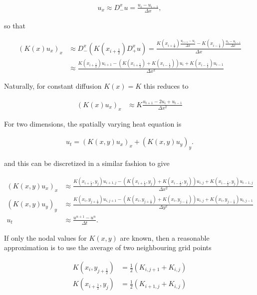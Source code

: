 \documentclass[11pt,a4paper,noindent]{article}
\begin{document}
\begin{align}
u_x \approx D_-^x u = \frac{u_{i}-u_{i-1}}{\Delta x},
\end{align}

so that

\begin{align}
(K(x) u_x)_x &\approx D_-^x(K(x_{i+\frac{1}{2}}) D_+^xu) = \frac{K(x_{i+\frac{1}{2}})\frac{u_{i+1}-u_{i}}{\Delta x} - K(x_{i-\frac{1}{2}})\frac{u_{i}-u_{i-1}}{\Delta x}}{\Delta x} \\
&\approx \frac{ K(x_{i+\frac{1}{2}}) u_{i+1} - 
			    (K(x_{i+\frac{1}{2}})+K(x_{i-\frac{1}{2}}))u_{i} + 								K(x_{i-\frac{1}{2}}) u_{i-1} }{\Delta x^2}
\end{align}

Naturally, for constant diffusion $K(x)=K$ this reduces to 

\begin{align}
(K(x) u_x)_x &\approx K \frac{ u_{i+1} - 2 u_{i} + u_{i-1} }{\Delta x^2}
\end{align}

For two dimensions, the spatially varying heat equation is

\begin{align}
u_t = (K(x,y) u_x)_x + (K(x,y) u_y)_y.
\end{align}

and this can be discretized in a similar fashion to give 

\begin{align}
(K(x,y) u_x)_x &\approx \frac{ K(x_{i+\frac{1}{2}},y_j) u_{i+1,j} - 
			    (K(x_{i+\frac{1}{2}},y_j)+K(x_{i-\frac{1}{2}},y_j))u_{i,j} + 								K(x_{i-\frac{1}{2}},y_j) u_{i-1,j} }{\Delta x^2} \\
(K(x,y) u_y)_y &\approx \frac{ K(x_{i},y_{j+\frac{1}{2}}) u_{i,j+1} - 
			    (K(x_{i},y_{j+\frac{1}{2}})+K(x_{i},y_{j-\frac{1}{2}}))u_{i,j} + 								K(x_{i},y_{j-\frac{1}{2}}) u_{i,j-1} }{\Delta y^2} \\
u_t &\approx \frac{u^{n+1} - u^n}{\Delta t}.
\end{align}

If only the nodal values for $K(x,y)$ are known, then a reasonable approximation is to use the average of two neighbouring grid points

\begin{align}
K(x_{i},y_{j+\frac{1}{2}}) &= \frac{1}{2} (K_{i,j+1}+K_{i,j}) \\
K(x_{i+\frac{1}{2}},y_{j}) &= \frac{1}{2} (K_{i+1,j}+K_{i,j})
\end{align}
\end{document}
